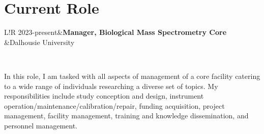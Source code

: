 \documentclass[11pt]{article}
\newcommand\VRule{\color{lightgray}\vrule width 0.5pt}
\begin{document}
\section*{Current Role}
\begin{tabular}{L!{\VRule}R}
	2023-present&\textbf{Manager, Biological Mass Spectrometry Core}\\
	&Dalhousie University\\
\end{tabular}\\

\begin{addmargin}[7.5em]{2em}%
	In this role, I am tasked with all aspects of management of a core facility catering to a wide range of individuals researching a diverse set of topics. My responsibilities include study conception and design, instrument operation/maintenance/calibration/repair, funding acquisition, project management, facility management, training and knowledge dissemination, and personnel management. 
\end{addmargin}
\end{document}
